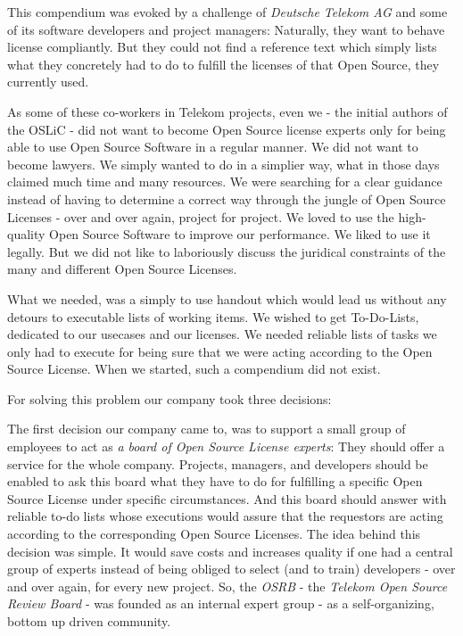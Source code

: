 This compendium was evoked by a challenge of \emph{Deutsche Telekom AG} and some
of its software developers and project managers: Naturally, they want to behave
license compliantly. But they could not find a reference text which simply lists
what they concretely had to do to fulfill the licenses of that Open Source, they
currently used.

As some of these co-workers in Telekom projects, even we - the initial authors
of the OSLiC - did not want to become Open Source license experts only for being
able to use Open Source Software in a regular manner. We did not want to become
lawyers. We simply wanted to do in a simplier way, what in those days claimed
much time and many resources. We were searching for a clear guidance instead of
having to determine a correct way through the jungle of Open Source Licenses -
over and over again, project for project. We loved to use the high-quality Open
Source Software to improve our performance. We liked to use it legally. But we
did not like to laboriously discuss the juridical constraints of the many and
different Open Source Licenses.

What we needed, was a simply to use handout which would lead us without any
detours to executable lists of working items. We wished to get To-Do-Lists,
dedicated to our usecases and our licenses. We needed reliable lists of tasks we
only had to execute for being sure that we were acting according to the Open
Source License. When we started, such a compendium did not exist.

For solving this problem our company took three decisions:

The first decision our company came to, was to support a small group of
employees to act as \emph{a board of Open Source License experts}: They should
offer a service for the whole company. Projects, managers, and developers should
be enabled to ask this board what they have to do for fulfilling a specific Open
Source License under specific circumstances. And this board should answer with
reliable to-do lists whose executions would assure that the requestors are
acting according to the corresponding Open Source Licenses. The idea behind this
decision was simple. It would save costs and increases quality if one had a
central group of experts instead of being obliged to select (and to train)
developers - over and over again, for every new project. So, the \emph{OSRB} -
the \emph{Telekom Open Source Review Board} - was founded as an internal expert
group - as a self-organizing, bottom up driven community.

